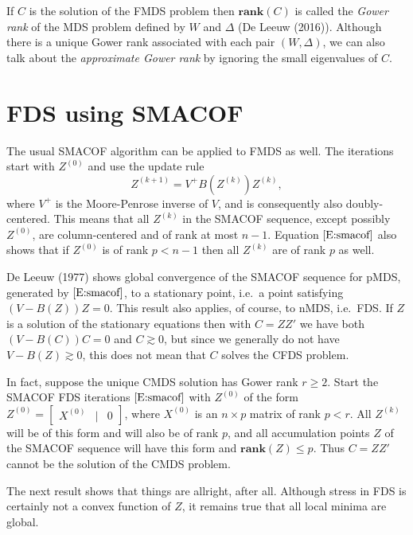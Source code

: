 \documentclass[
  12pt,
]{article}
\begin{document}
If \(C\) is the solution of the FMDS problem then \(\mathbf{rank}(C)\)
is called the \emph{Gower rank} of the MDS problem defined by \(W\) and
\(\Delta\) (De Leeuw (2016)). Although there is a unique Gower rank
associated with each pair \((W,\Delta)\), we can also talk about the
\emph{approximate Gower rank} by ignoring the small eigenvalues of
\(C\).

\section{FDS using SMACOF}\label{fds-using-smacof}

The usual SMACOF algorithm can be applied to FMDS as well. The
iterations start with \(Z^{(0)}\) and use the update rule
\begin{equation}\label{E:smacof}
Z^{(k+1)}=V^+B(Z^{(k)})Z^{(k)},
\end{equation} where \(V^+\) is the Moore-Penrose inverse of \(V\), and
is consequently also doubly-centered. This means that all \(Z^{(k)}\) in
the SMACOF sequence, except possibly \(Z^{(0)}\), are column-centered
and of rank at most \(n-1\). Equation \(\eqref{E:smacof}\) also shows
that if \(Z^{(0)}\) is of rank \(p<n-1\) then all \(Z^{(k)}\) are of
rank \(p\) as well.

De Leeuw (1977) shows global convergence of the SMACOF sequence for
pMDS, generated by \(\eqref{E:smacof}\), to a stationary point, i.e.~a
point satisfying \((V-B(Z))Z=0\). This result also applies, of course,
to nMDS, i.e.~FDS. If \(Z\) is a solution of the stationary equations
then with \(C=ZZ'\) we have both \((V-B(C))C=0\) and \(C\gtrsim 0\), but
since we generally do not have \(V-B(Z)\gtrsim 0\), this does not mean
that \(C\) solves the CFDS problem.

In fact, suppose the unique CMDS solution has Gower rank \(r\geq 2\).
Start the SMACOF FDS iterations \(\eqref{E:smacof}\) with \(Z^{(0)}\) of
the form \(Z^{(0)}=\begin{bmatrix}X^{(0)}&\mid&0\end{bmatrix}\), where
\(X^{(0)}\) is an \(n\times p\) matrix of rank \(p<r\). All \(Z^{(k)}\)
will be of this form and will also be of rank \(p\), and all
accumulation points \(Z\) of the SMACOF sequence will have this form and
\(\mathbf{rank}(Z)\leq p\). Thus \(C=ZZ'\) cannot be the solution of the
CMDS problem.

The next result shows that things are allright, after all. Although
stress in FDS is certainly not a convex function of \(Z\), it remains
true that all local minima are global.
\end{document}
